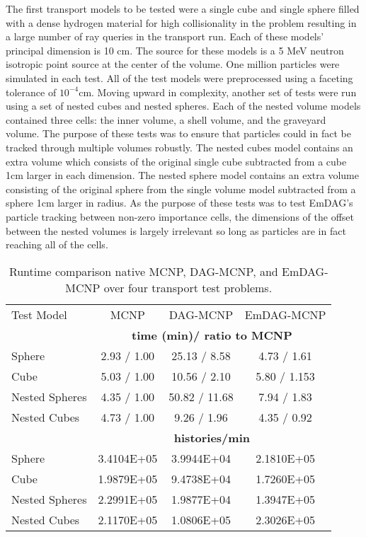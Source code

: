 The first transport models to be tested were a single cube and single sphere
filled with a dense hydrogen material for high collisionality in the problem
resulting in a large number of ray queries in the transport run. Each of these
models' principal dimension is 10 cm. The source for these models is a 5 MeV
neutron isotropic point source at the center of the volume. One million
particles were simulated in each test. All of the test models were preprocessed
using a faceting tolerance of $10^{-4}$cm. Moving upward in complexity, another
set of tests were run using a set of nested cubes and nested spheres. Each of
the nested volume models contained three cells: the inner volume, a shell
volume, and the graveyard volume. The purpose of these tests was to ensure that
particles could in fact be tracked through multiple volumes robustly. The nested
cubes model contains an extra volume which consists of the original single cube
subtracted from a cube 1cm larger in each dimension. The nested sphere model
contains an extra volume consisting of the original sphere from the single
volume model subtracted from a sphere 1cm larger in radius. As the purpose of
these tests was to test EmDAG's particle tracking between non-zero importance
cells, the dimensions of the offset between the nested volumes is largely
irrelevant so long as particles are in fact reaching all of the cells.

\begin{table}[H]
  \small
  \begin{center}

      \label{timings}
    \begin{tabular}{lccc}

      \toprule
      Test Model & MCNP & DAG-MCNP & EmDAG-MCNP \\
      & \multicolumn{3}{c}{\textbf{time (min)/ ratio to MCNP}} \\
      \hline
      Sphere & 2.93 / 1.00 & 25.13 / 8.58  & 4.73 / 1.61  \\
      Cube & 5.03 / 1.00 & 10.56 / 2.10 & 5.80 / 1.153 \\
      Nested Spheres & 4.35 / 1.00  & 50.82 / 11.68  & 7.94 / 1.83 \\
      Nested Cubes & 4.73 / 1.00 & 9.26 / 1.96 & 4.35 / 0.92 \\
      &  \multicolumn{3}{c}{\textbf{histories/min}} \\
      \hline
      Sphere & 3.4104E+05  & 3.9944E+04  & 2.1810E+05   \\
      Cube & 1.9879E+05 & 9.4738E+04 & 1.7260E+05 \\
      Nested Spheres & 2.2991E+05 & 1.9877E+04 & 1.3947E+05 \\
      Nested Cubes & 2.1170E+05 & 1.0806E+05 & 2.3026E+05 \\
      \bottomrule
      
    \end{tabular}
  \end{center}
  \caption{Runtime comparison native MCNP, DAG-MCNP, and EmDAG-MCNP over four
    transport test problems.}
  
\end{table}

